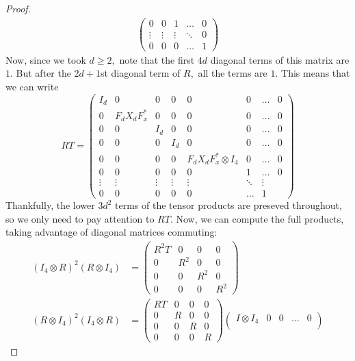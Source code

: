 \documentclass{article}
\begin{document}
\begin{enumerate}
\begin{proof}
\begin{align*}
\begin{pmatrix}
            0 & 0  & 1 & \dots & 0\\
            \vdots & \vdots & \vdots & \ddots & 0\\
            0 & 0 & 0 &\dots & 1
          \end{pmatrix}
        \end{align*}
        Now, since we took $d\ge 2,$ note that the first $4d$ diagonal terms of this matrix are $1$. But after the $2d+1$st diagonal term of $R,$ all the terms are $1.$ This means that we can write 
        \[RT = \begin{pmatrix}
          I_d & 0 & 0 &0 & 0 & 0 & \dots & 0\\
          0 & F_dX_dF_x^* & 0 &0 & 0 & 0 & \dots & 0\\
          0 & 0 & I_d&0 & 0 & 0 & \dots & 0\\
          0 & 0 & 0 &I_d & 0 & 0 & \dots & 0\\
          0 & 0 & 0 &0 & F_dX_dF_x^*\otimes I_4 & 0 & \dots & 0\\
          0 & 0 & 0 &0 & 0 & 1 & \dots & 0\\
          \vdots & \vdots & \vdots & \vdots &\vdots & \ddots &\vdots\\
          0 & 0 & 0 & 0  & 0 & \dots & 1
        \end{pmatrix}\] 
        Thankfully, the lower $3d^2$ terms of the tensor products are preseved throughout, so we only need to pay attention to $RT$. Now, we can compute the full products, taking advantage of diagonal matrices commuting:
        \begin{align*}
          (I_4\otimes R)^2(R\otimes I_4) &= \begin{pmatrix}
            R^2T & 0 & 0 &0\\
            0 & R^2 & 0 & 0\\
            0 & 0 & R^2 & 0\\
            0 & 0 & 0 & R^2
          \end{pmatrix}\\
          (R\otimes I_4)^2(I_4\otimes R) &= \begin{pmatrix}
            RT & 0 & 0 & 0\\
            0 & R & 0 & 0\\
            0 & 0 & R & 0\\
            0 & 0 & 0 & R
          \end{pmatrix}\begin{pmatrix} 
            I\otimes I_4 & 0 & 0 & \dots & 0\\

\end{pmatrix}
\end{align*}
\end{proof}
\end{enumerate}
\end{document}
